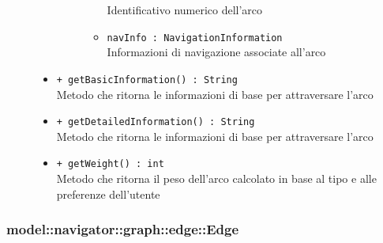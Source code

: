 \documentclass[../DefinizioneDiProdotto.tex]{subfiles}
\begin{document}
\begin{description}
\begin{itemize}
\begin{description}
\begin{itemize}
Identificativo numerico dell'arco\item \texttt{navInfo : NavigationInformation}\\
Informazioni di navigazione associate all'arco\end{itemize}
\end{description}
\item \texttt{+ getBasicInformation() : String}\\
Metodo che ritorna le informazioni di base per attraversare l'arco
 \item \texttt{+ getDetailedInformation() : String}\\
Metodo che ritorna le informazioni di base per attraversare l'arco
 \item \texttt{+ getWeight() : int}\\
Metodo che ritorna il peso dell'arco calcolato in base al tipo e alle preferenze dell'utente
 \end{itemize}
\end{description}

\subsubsection{model::navigator::graph::edge::Edge}
\end{document}

